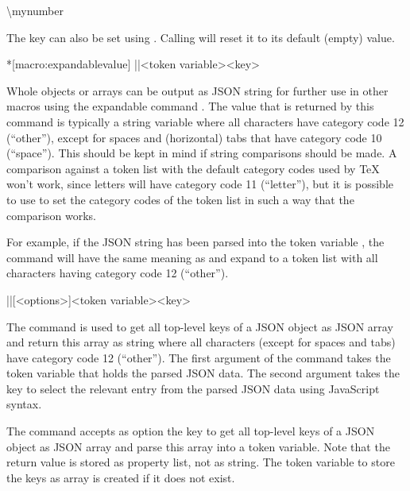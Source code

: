 \documentclass[a4paper]{article}
\begin{document}
{{
\begin{codeexamplecolumns}
\num{\mynumber}
\end{codeexamplecolumns}

The key  can also be set using \macro{\JSONParseSet}. Calling  will reset it to its default (empty) value.

\begin{macrodef}*[macro:expandablevalue]
|\JSONParseExpandableValue|{<token variable>}{<key>}
\end{macrodef}
Whole objects or arrays can be output as JSON string for further use in other macros using the expandable command \macro{\JSONParseExpandableValue}. The value that is returned by this command is typically a string variable where all characters have category code 12 (``other''), except for spaces and (horizontal) tabs that have category code 10 (``space''). This should be kept in mind if string comparisons should be made. A comparison against a token list with the default category codes used by TeX won't work, since letters will have category code 11 (``letter''), but it is possible to use \macro{\detokenize} to set the category codes of the token list in such a way that the comparison works.

For example, if the JSON string  has been parsed into the token variable \macro{\myJSONdata}, the command  will have the same meaning as  and expand to a token list with all characters having category code 12 (``other'').

\begin{macrodef}
|\JSONParseKeys|[<options>]{<token variable>}{<key>}
\end{macrodef}
The command \macro{\JSONParseKeys} is used to get all top-level keys of a JSON object as JSON array and return this array as string where all characters (except for spaces and tabs) have category code 12 (``other''). The first argument of the command takes the token variable that holds the parsed JSON data. The second argument takes the key to select the relevant entry from the parsed JSON data using JavaScript syntax.

The command \macro{\JSONParseKeys} accepts as option the key  to get all top-level keys of a JSON object as JSON array and parse this array into a token variable. Note that the return value is stored as property list, not as string. The token variable to store the keys as array is created if it does not exist.

}}
\end{document}
